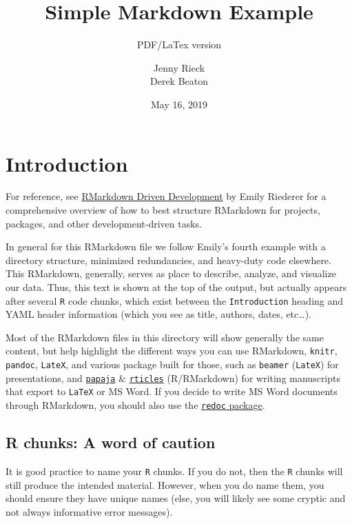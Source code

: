 \documentclass[]{article}
\title{Simple Markdown Example}
\subtitle{PDF/LaTex version}
\author{Jenny Rieck \\ Derek Beaton}
\date{May 16, 2019}
\begin{document}
\maketitle

\hypertarget{introduction}{%
\section{Introduction}\label{introduction}}

For reference, see
\href{https://emilyriederer.netlify.com/post/rmarkdown-driven-development/}{RMarkdown
Driven Development} by Emily Riederer for a comprehensive overview of
how to best structure RMarkdown for projects, packages, and other
development-driven tasks.

In general for this RMarkdown file we follow Emily's fourth example with
a directory structure, minimized redundancies, and heavy-duty code
elsewhere. This RMarkdown, generally, serves as place to describe,
analyze, and visualize our data. Thus, this text is shown at the top of
the output, but actually appears after several \texttt{R} code chunks,
which exist between the \texttt{Introduction} heading and YAML header
information (which you see as title, authors, dates, etc\ldots{}).

Most of the RMarkdown files in this directory will show generally the
same content, but help highlight the different ways you can use
RMarkdown, \texttt{knitr}, \texttt{pandoc}, \texttt{LateX}, and various
package built for those, such as \texttt{beamer} (\texttt{LateX}) for
presentations, and
\href{https://github.com/crsh/papaja}{\texttt{papaja}} \&
\href{https://github.com/rstudio/rticles}{\texttt{rticles}}
(R/RMarkdown) for writing manuscripts that export to \texttt{LaTeX} or
MS Word. If you decide to write MS Word documents through RMarkdown, you
should also use the
\href{https://github.com/noamross/redoc}{\texttt{redoc} package}.

\hypertarget{r-chunks-a-word-of-caution}{%
\subsection{R chunks: A word of
caution}\label{r-chunks-a-word-of-caution}}

It is good practice to name your \texttt{R} chunks. If you do not, then
the \texttt{R} chunks will still produce the intended material. However,
when you do name them, you should ensure they have unique names (else,
you will likely see some cryptic and not always informative error
messages).
\end{document}
